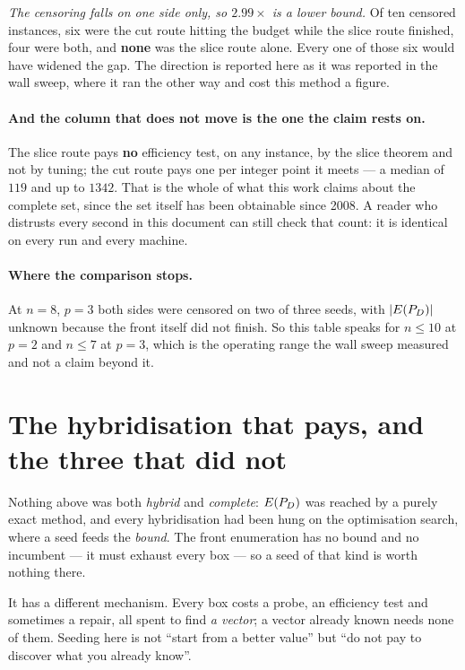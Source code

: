 \documentclass[11pt,a4paper]{article}
\begin{document}
\emph{The censoring falls on one side only, so $2.99\times$ is a lower bound.}
Of ten censored instances, six were the cut route hitting the budget while the
slice route finished, four were both, and \textbf{none} was the slice route
alone.  Every one of those six would have widened the gap.  The direction is
reported here as it was reported in the wall sweep, where it ran the other
way and cost this method a figure.

\paragraph{And the column that does not move is the one the claim rests on.}
The slice route pays \textbf{no} efficiency test, on any instance, by the slice theorem and not by tuning; the cut route pays one per integer
point it meets --- a median of $119$ and up to $1342$.  That is the whole of
what this work claims about the complete set, since the set itself has been
obtainable since 2008.  A reader who distrusts every second in this document
can still check that count: it is identical on every run and every machine.

\paragraph{Where the comparison stops.}  At $n=8$, $p=3$ both sides were
censored on two of three seeds, with $|E(P_{D})|$ unknown because the front itself
did not finish.  So this table speaks for $n \leqslant 10$ at $p=2$ and
$n \leqslant 7$ at $p=3$, which is the operating range the wall sweep
measured and not a claim beyond it.

\section{The hybridisation that pays, and the three that did not}

Nothing above was both \emph{hybrid} and \emph{complete}: $E(P_{D})$ was reached by a
purely exact method, and every hybridisation had been hung on the optimisation
search, where a seed feeds the \emph{bound}.  The front enumeration has no
bound and no incumbent --- it must exhaust every box --- so a seed of that kind
is worth nothing there.

It has a different mechanism.  Every box costs a probe, an efficiency test and
sometimes a repair, all spent to find \emph{a vector}; a vector already known
needs none of them.  Seeding here is not ``start from a better value'' but
``do not pay to discover what you already know''.
\end{document}
